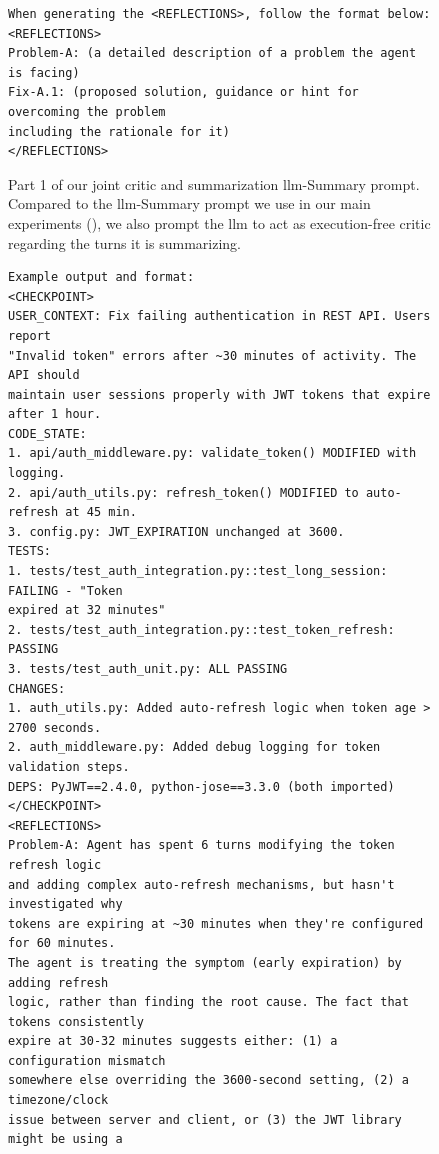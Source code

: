 \documentclass{article}
\begin{document}
\begin{figure}[th]
\begin{tcolorbox}[
  colback=jb_magenta_accent,
  colframe=jb_magenta,
  title=Joint Critic-Summary Prompt (Part 1), width=\textwidth
]
\begin{small}
\begin{verbatim}
When generating the <REFLECTIONS>, follow the format below:
<REFLECTIONS>
Problem-A: (a detailed description of a problem the agent is facing)
Fix-A.1: (proposed solution, guidance or hint for overcoming the problem 
including the rationale for it)
</REFLECTIONS>
\end{verbatim}
\end{small}
\end{tcolorbox}
\caption{Part 1 of our joint critic and summarization \ac{llm}-Summary prompt. Compared to the \ac{llm}-Summary prompt we use in our main experiments (), we also prompt the \ac{llm} to act as execution-free critic regarding the turns it is summarizing.}
\label{fig:prompt:llm-critic-1}
\end{figure}

\begin{figure}[th]
\begin{tcolorbox}[
  colback=jb_magenta_accent,
  colframe=jb_magenta,
  title=Joint Critic-Summary Prompt (Part 2), width=\textwidth
]
\begin{small}
\begin{verbatim}
Example output and format:
<CHECKPOINT>
USER_CONTEXT: Fix failing authentication in REST API. Users report 
"Invalid token" errors after ~30 minutes of activity. The API should 
maintain user sessions properly with JWT tokens that expire after 1 hour.
CODE_STATE: 
1. api/auth_middleware.py: validate_token() MODIFIED with logging.
2. api/auth_utils.py: refresh_token() MODIFIED to auto-refresh at 45 min.
3. config.py: JWT_EXPIRATION unchanged at 3600.
TESTS:
1. tests/test_auth_integration.py::test_long_session: FAILING - "Token 
expired at 32 minutes"
2. tests/test_auth_integration.py::test_token_refresh: PASSING
3. tests/test_auth_unit.py: ALL PASSING
CHANGES:
1. auth_utils.py: Added auto-refresh logic when token age > 2700 seconds.
2. auth_middleware.py: Added debug logging for token validation steps.
DEPS: PyJWT==2.4.0, python-jose==3.3.0 (both imported)
</CHECKPOINT>
<REFLECTIONS>
Problem-A: Agent has spent 6 turns modifying the token refresh logic 
and adding complex auto-refresh mechanisms, but hasn't investigated why
tokens are expiring at ~30 minutes when they're configured for 60 minutes.
The agent is treating the symptom (early expiration) by adding refresh 
logic, rather than finding the root cause. The fact that tokens consistently 
expire at 30-32 minutes suggests either: (1) a configuration mismatch 
somewhere else overriding the 3600-second setting, (2) a timezone/clock 
issue between server and client, or (3) the JWT library might be using a 

\end{verbatim}
\end{small}
\end{tcolorbox}
\end{figure}
\end{document}
